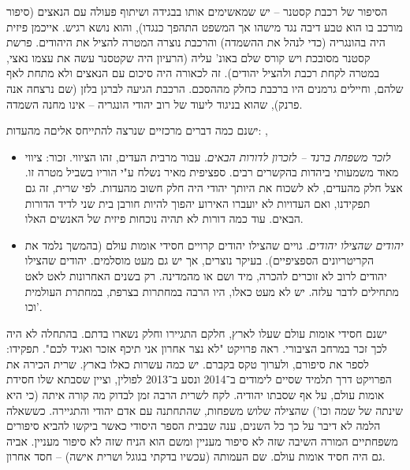 \documentclass[a4paper]{book}
\begin{document}
	הסיפור של רכבת קסטנר – יש שמאשימים אותו בבגידה ושיתוף פעולה עם הנאצים (סיפור מורכב בו הוא טבע דיבה נגד מישהו אך המשפט התהפך כנגדו), והוא נושא רגיש. אייכמן פיזית היה בהונגריה (כדי לנהל את ההשמדה) והרכבת נוצרה המטרה להציל את היהודים. פרשת קסטנר מסובכת ויש קורס שלם באונ' עליה (הרעיון היה שקטסנר עשה את עצמו נאצי, במטרה לקחת רכבת ולהציל יהודים). זה לכאורה היה סיכום עם הנאצים ולא מתחת לאף שלהם, וחיילים גרמנים היו ברכבת כחלק מההסכם. הרכבת הגיעה לברגן בלזן (שם נרצחה אנה פרנק), שהוא בניגוד ליעוד של רוב יהודי הונגריה – אינו מחנה השמדה. 
	
	ישנם כמה דברים מרכזיים שנרצה להתייחס אליםה מהעדות: 
	,\begin{itemize}
		\item \textit{לזכר משפחת ברנד – לזכרון לדורות הבאים}. עבור מרבית העדים, זהו הציווי. זכור: ציווי מאוד משמעותי ביהדות בהקשרים רבים. ספציפית מאיר נשלח ע"י הוריו בשביל מטרה זו. אצל חלק מהעדים, לא לשכוח את היותך יהודי היה חלק חשוב מהעדות. לפי שרית, זה גם תפקידנו, ואם העדויות לא יועברו האירוע יהפוך להיות חורבן בית שני לדיד הדורות הבאים. עוד כמה דורות לא תהיה נוכחות פיזית של האנשים האלו. 
		\item \textit{יהודים שהצילו יהודים}. גויים שהצילו יהודים קרויים חסידי אומות עולם (בהמשך נלמד את הקריטריונים הספציפיים). בעיקר נוצרים, אך יש גם מעט מוסלמים. יהודים שהצילו יהודים לרוב לא זוכרים להכרה, מיד ושם או מהמדינה. רק בשנים האחרונות לאט לאט מתחילים לדבר עלזה. יש לא מעט כאלו, היו הרבה במחתרות בצרפת, במחתרת העולמית וכו'. 
	\end{itemize}
	
	ישנם חסידי אומות עולם שעלו לארץ, חלקם התגיירו וחלק נשארו בדתם. בהתחלה לא היה לכך זכר במרחב הציבורי. ראה פרויקט "לא נצר אחרון אני תיכף אזכר ואגיד לכם". תפקידו: לספר את סיפורם, ולערוך טקס בקברם. יש כמה עשרות כאלו בארץ. שרית הכירה את הפרויקט דרך תלמיד שסיים לימודים ב־2014 ונסע ב־2013 לפולין, וציין שסבתא שלו חסידת אומות עולם, על אף שסבתו יהודיה. לקח לשרית הרבה זמן לבדוק מה קורה איתה (כי היא שינתה של שמה וכו') שהצילה שלוש משפחות, שהתחתנה עם אדם יהודי והתגיירה. כששאלה הלמה לא דיבר על כך כל השנים, ענה שבבית הספר היסודי כאשר ביקשו להביא סיפורים משפחתיים המורה השיבה שזה לא סיפור מעניין ומשם הוא הניח שזה לא סיפור מעניין. אביה גם היה חסיד אומות עולם. שם העמותה (עכשיו בדקתי בגוגל ושרית אישה) – חסד אחרון. 
	
	
\end{document}
